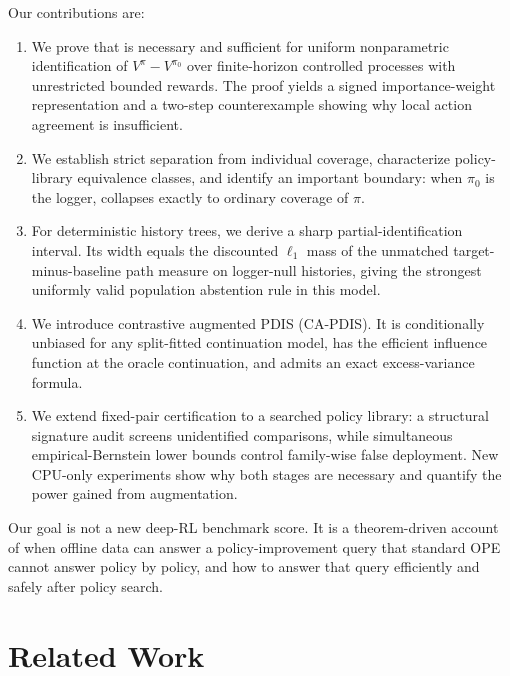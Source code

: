 Our contributions are:
\begin{enumerate}
    \item We prove that \UCC is necessary and sufficient for uniform nonparametric identification of $V^\pi-V^{\pi_0}$ over finite-horizon controlled processes with unrestricted bounded rewards. The proof yields a signed importance-weight representation and a two-step counterexample showing why local action agreement is insufficient.
    \item We establish strict separation from individual coverage, characterize policy-library equivalence classes, and identify an important boundary: when $\pi_0$ is the logger, \UCC collapses exactly to ordinary coverage of $\pi$.
    \item For deterministic history trees, we derive a sharp partial-identification interval. Its width equals the discounted $\ell_1$ mass of the unmatched target-minus-baseline path measure on logger-null histories, giving the strongest uniformly valid population abstention rule in this model.
    \item We introduce contrastive augmented PDIS (CA-PDIS). It is conditionally unbiased for any split-fitted continuation model, has the efficient influence function at the oracle continuation, and admits an exact excess-variance formula.
    \item We extend fixed-pair certification to a searched policy library: a structural signature audit screens unidentified comparisons, while simultaneous empirical-Bernstein lower bounds control family-wise false deployment. New CPU-only experiments show why both stages are necessary and quantify the power gained from augmentation.
\end{enumerate}

Our goal is not a new deep-RL benchmark score. It is a theorem-driven account of when offline data can answer a policy-improvement query that standard OPE cannot answer policy by policy, and how to answer that query efficiently and safely after policy search.

\section{Related Work}

